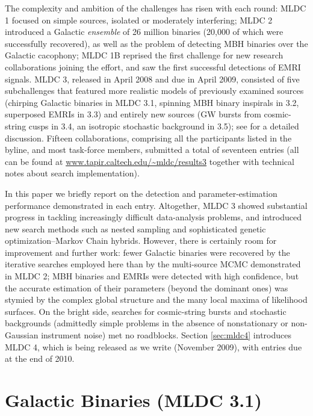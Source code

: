 \documentclass{iopart}
\begin{document}
The complexity and ambition of the challenges has risen with each round: MLDC 1 \cite{mldclisasymp,mldcgwdaw1} focused on simple sources, isolated or moderately interfering; MLDC 2 \cite{mldcgwdaw2,mldcamaldi2} introduced a Galactic \emph{ensemble} of 26 million binaries (20,000 of which were successfully recovered), as well as the problem of detecting MBH binaries over the Galactic cacophony; MLDC 1B \cite{MLDC3} reprised the first challenge for new research collaborations joining the effort, and saw the first successful detections of EMRI signals. MLDC 3, released in April 2008 and due in April 2009, consisted of five subchallenges that featured more realistic models of previously examined sources (chirping Galactic binaries in MLDC 3.1, spinning MBH binary inspirals in 3.2, superposed EMRIs in 3.3) and entirely new sources (GW bursts from cosmic-string cusps in 3.4, an isotropic stochastic background in 3.5); see \cite{MLDC3} for a detailed discussion. Fifteen collaborations, comprising all the participants listed in the byline, and most task-force members, submitted a total of seventeen entries (all can be found at \url{www.tapir.caltech.edu/~mldc/results3} together with technical notes about search implementation).

In this paper we briefly report on the detection and parameter-estimation performance demonstrated in each entry. Altogether, MLDC 3 showed substantial progress in tackling increasingly difficult data-analysis problems, and introduced new search methods such as nested sampling and sophisticated genetic optimization--Markov Chain hybrids. However, there is certainly room for improvement and further work: fewer Galactic binaries were recovered by the iterative searches employed here than by the multi-source MCMC demonstrated in MLDC 2; MBH binaries and EMRIs were detected with high confidence, but the accurate estimation of their parameters (beyond the dominant ones) was stymied by the complex global structure and the many local maxima of likelihood surfaces. On the bright side, searches for cosmic-string bursts and stochastic backgrounds (admittedly simple problems in the absence of nonstationary or non-Gaussian instrument noise) met no roadblocks.
Section \ref{sec:mldc4} introduces MLDC 4, which is being released as we write (November 2009), with entries due at the end of 2010.

\section{Galactic Binaries (MLDC 3.1)}
\end{document}
